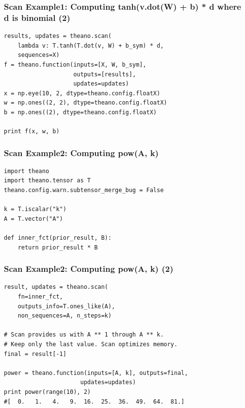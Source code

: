 \documentclass[utf8x,xcolor=pdftex,dvipsnames,table]{beamer}
\begin{document}
\begin{frame}[fragile]
  \frametitle{Scan Example1: Computing tanh(v.dot(W) + b) * d where d is binomial (2)}

\begin{lstlisting}
results, updates = theano.scan(
    lambda v: T.tanh(T.dot(v, W) + b_sym) * d,
    sequences=X)
f = theano.function(inputs=[X, W, b_sym],
                    outputs=[results],
                    updates=updates)
x = np.eye(10, 2, dtype=theano.config.floatX)
w = np.ones((2, 2), dtype=theano.config.floatX)
b = np.ones((2), dtype=theano.config.floatX)

print f(x, w, b)
\end{lstlisting}
\end{frame}

\begin{frame}[fragile]
  \frametitle{Scan Example2: Computing pow(A, k)}

\begin{lstlisting}
import theano
import theano.tensor as T
theano.config.warn.subtensor_merge_bug = False

k = T.iscalar("k")
A = T.vector("A")

def inner_fct(prior_result, B):
    return prior_result * B
\end{lstlisting}
\end{frame}

\begin{frame}[fragile]
  \frametitle{Scan Example2: Computing pow(A, k) (2)}

\begin{lstlisting}
result, updates = theano.scan(
    fn=inner_fct,
    outputs_info=T.ones_like(A),
    non_sequences=A, n_steps=k)

# Scan provides us with A ** 1 through A ** k.
# Keep only the last value. Scan optimizes memory.
final = result[-1]

power = theano.function(inputs=[A, k], outputs=final,
                      updates=updates)
print power(range(10), 2)
#[  0.   1.   4.   9.  16.  25.  36.  49.  64.  81.]
\end{lstlisting}
\end{frame}
\end{document}
